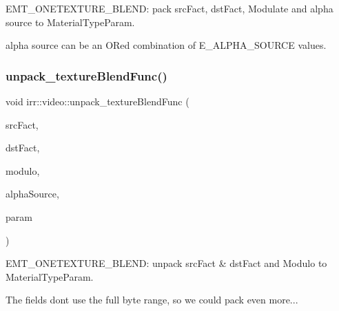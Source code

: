 E\+M\+T\+\_\+\+O\+N\+E\+T\+E\+X\+T\+U\+R\+E\+\_\+\+B\+L\+E\+ND\+: pack src\+Fact, dst\+Fact, Modulate and alpha source to Material\+Type\+Param. 

alpha source can be an OR\textquotesingle{}ed combination of E\+\_\+\+A\+L\+P\+H\+A\+\_\+\+S\+O\+U\+R\+CE values. \mbox{\label{namespaceirr_1_1video_a6d0644626c746278881ceae7e33e75c0}} 
\subsubsection{\texorpdfstring{unpack\+\_\+texture\+Blend\+Func()}{unpack\_textureBlendFunc()}}
{\footnotesize\ttfamily void irr\+::video\+::unpack\+\_\+texture\+Blend\+Func (\begin{DoxyParamCaption}\item[{\hyperlink{namespaceirr_1_1video_acae10401850a6cfd5fcf1548c6c884bc}{E\+\_\+\+B\+L\+E\+N\+D\+\_\+\+F\+A\+C\+T\+OR} \&}]{src\+Fact,  }\item[{\hyperlink{namespaceirr_1_1video_acae10401850a6cfd5fcf1548c6c884bc}{E\+\_\+\+B\+L\+E\+N\+D\+\_\+\+F\+A\+C\+T\+OR} \&}]{dst\+Fact,  }\item[{\hyperlink{namespaceirr_1_1video_a1402e9045137ae232fafbdf385800843}{E\+\_\+\+M\+O\+D\+U\+L\+A\+T\+E\+\_\+\+F\+U\+NC} \&}]{modulo,  }\item[{\hyperlink{namespaceirr_a0416a53257075833e7002efd0a18e804}{u32} \&}]{alpha\+Source,  }\item[{const \hyperlink{namespaceirr_a0277be98d67dc26ff93b1a6a1d086b07}{f32}}]{param }\end{DoxyParamCaption})\hspace{0.3cm}{\ttfamily [inline]}}



E\+M\+T\+\_\+\+O\+N\+E\+T\+E\+X\+T\+U\+R\+E\+\_\+\+B\+L\+E\+ND\+: unpack src\+Fact \& dst\+Fact and Modulo to Material\+Type\+Param. 

The fields don\textquotesingle{}t use the full byte range, so we could pack even more... 